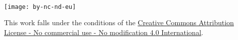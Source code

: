
\newpage
\thispagestyle{empty}

~\vfill
\begin{center}
    \begin{minipage}[c]{0.25\linewidth}
        \raggedright\texttt{[image: by-nc-nd-eu]}
    \end{minipage}\hfill
\end{center}

This work falls under the conditions of the 
\href{https://creativecommons.org/licenses/by-nc-nd/4.0}{Creative Commons Attribution License - No commercial use - No modification 4.0 International}.
